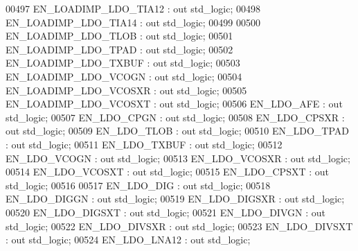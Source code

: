 \begin{DoxyCode}
00497         EN\_LOADIMP\_LDO\_TIA12  : \textcolor{keywordflow}{out} \textcolor{comment}{std\_logic};
00498         EN\_LOADIMP\_LDO\_TIA14  : \textcolor{keywordflow}{out} \textcolor{comment}{std\_logic};
00499 
00500         EN\_LOADIMP\_LDO\_TLOB         : \textcolor{keywordflow}{out} \textcolor{comment}{std\_logic};
00501         EN\_LOADIMP\_LDO\_TPAD     : \textcolor{keywordflow}{out} \textcolor{comment}{std\_logic};
00502         EN\_LOADIMP\_LDO\_TXBUF    : \textcolor{keywordflow}{out} \textcolor{comment}{std\_logic};
00503         EN\_LOADIMP\_LDO\_VCOGN    : \textcolor{keywordflow}{out} \textcolor{comment}{std\_logic};
00504         EN\_LOADIMP\_LDO\_VCOSXR   : \textcolor{keywordflow}{out} \textcolor{comment}{std\_logic};
00505         EN\_LOADIMP\_LDO\_VCOSXT   : \textcolor{keywordflow}{out} \textcolor{comment}{std\_logic};
00506         EN\_LDO\_AFE              : \textcolor{keywordflow}{out} \textcolor{comment}{std\_logic};
00507         EN\_LDO\_CPGN             : \textcolor{keywordflow}{out} \textcolor{comment}{std\_logic};
00508         EN\_LDO\_CPSXR            : \textcolor{keywordflow}{out} \textcolor{comment}{std\_logic};
00509         EN\_LDO\_TLOB             : \textcolor{keywordflow}{out} \textcolor{comment}{std\_logic};
00510         EN\_LDO\_TPAD             : \textcolor{keywordflow}{out} \textcolor{comment}{std\_logic};
00511         EN\_LDO\_TXBUF            : \textcolor{keywordflow}{out} \textcolor{comment}{std\_logic};
00512         EN\_LDO\_VCOGN            : \textcolor{keywordflow}{out} \textcolor{comment}{std\_logic};
00513         EN\_LDO\_VCOSXR           : \textcolor{keywordflow}{out} \textcolor{comment}{std\_logic};
00514         EN\_LDO\_VCOSXT           : \textcolor{keywordflow}{out} \textcolor{comment}{std\_logic};
00515         EN\_LDO\_CPSXT            : \textcolor{keywordflow}{out} \textcolor{comment}{std\_logic};
00516 
00517         EN\_LDO\_DIG          : \textcolor{keywordflow}{out} \textcolor{comment}{std\_logic};
00518         EN\_LDO\_DIGGN    : \textcolor{keywordflow}{out} \textcolor{comment}{std\_logic};
00519         EN\_LDO\_DIGSXR   : \textcolor{keywordflow}{out} \textcolor{comment}{std\_logic};
00520         EN\_LDO\_DIGSXT   : \textcolor{keywordflow}{out} \textcolor{comment}{std\_logic};
00521         EN\_LDO\_DIVGN    : \textcolor{keywordflow}{out} \textcolor{comment}{std\_logic};
00522         EN\_LDO\_DIVSXR   : \textcolor{keywordflow}{out} \textcolor{comment}{std\_logic};
00523         EN\_LDO\_DIVSXT   : \textcolor{keywordflow}{out} \textcolor{comment}{std\_logic};
00524         EN\_LDO\_LNA12    : \textcolor{keywordflow}{out} \textcolor{comment}{std\_logic};

\end{DoxyCode}
